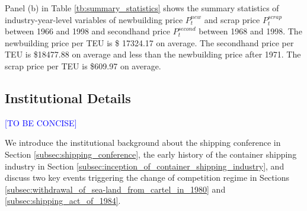 \documentclass[11pt]{article}
\begin{document}
Panel (b) in Table \ref{tb:summary_statistics} shows the summary statistics of industry-year-level variables of newbuilding price $P_{t}^{new}$ and scrap price $P_{t}^{scrap}$ between 1966 and 1998 and secondhand price $P_{t}^{second}$ between 1968 and 1998. The newbuilding price per TEU is \$ 17324.17 on average. The secondhand price per TEU is \$18477.88 on average and less than the newbuilding price after 1971. The scrap price per TEU is \$609.97 on average.

\subsection{Institutional Details}\label{subsec:institutional_details}
\textcolor{blue}{[TO BE CONCISE]}

We introduce the institutional background about the shipping conference in Section \ref{subsec:shipping_conference}, the early history of the container shipping industry in Section \ref{subsec:inception_of_container_shipping_industry}, and discuss two key events triggering the change of competition regime in Sections \ref{subsec:withdrawal_of_sea-land_from_cartel_in_1980} and \ref{subsec:shipping_act_of_1984}.
\end{document}
